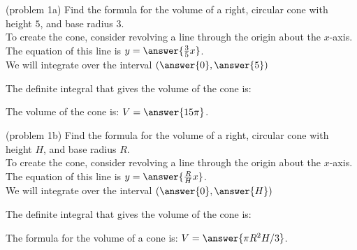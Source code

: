 \documentclass{ximera}
\begin{document}
\begin{problem}(problem 1a)
Find the formula for the volume of a right, circular cone with height $5$, and base radius $3$.\\

To create the cone, consider revolving a line through the origin about the $x$-axis.\\
The equation of this line is $y = \answer{\frac{3}{5} x}$.\\
We will integrate over the interval $\left(\answer{0},\answer{5}\right)$

The definite integral that gives the volume of the cone is:\\
\begin{multipleChoice}
\end{multipleChoice}

The volume of the cone is: \; $V = \answer{15 \pi }$.










\end{problem}



\begin{problem}(problem 1b)
Find the formula for the volume of a right, circular cone with height $H$, and base radius $R$.\\

To create the cone, consider revolving a line through the origin about the $x$-axis.\\
The equation of this line is $y = \answer{\frac{R}{H} x}$.\\
We will integrate over the interval $\left(\answer{0},\answer{H}\right)$

The definite integral that gives the volume of the cone is:\\
\begin{multipleChoice}
\end{multipleChoice}

The formula for the volume of a cone is: \; $V = \answer{\pi R^2 H/3}$.

\end{problem}
\end{document}
